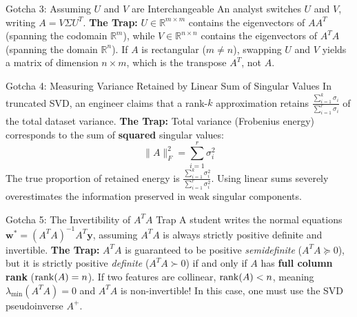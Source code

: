 \begin{trapbox}{Gotcha 3: Assuming $U$ and $V$ are Interchangeable}
An analyst switches $U$ and $V$, writing $A = V \Sigma U^T$.
\textbf{The Trap:} $U \in \mathbb{R}^{m \times m}$ contains the eigenvectors of $A A^T$ (spanning the codomain $\mathbb{R}^m$), while $V \in \mathbb{R}^{n \times n}$ contains the eigenvectors of $A^T A$ (spanning the domain $\mathbb{R}^n$). If $A$ is rectangular ($m \ne n$), swapping $U$ and $V$ yields a matrix of dimension $n \times m$, which is the transpose $A^T$, not $A$.
\end{trapbox}

\begin{trapbox}{Gotcha 4: Measuring Variance Retained by Linear Sum of Singular Values}
In truncated SVD, an engineer claims that a rank-$k$ approximation retains $\frac{\sum_{i=1}^k \sigma_i}{\sum_{i=1}^r \sigma_i}$ of the total dataset variance.
\textbf{The Trap:} Total variance (Frobenius energy) corresponds to the sum of \textbf{squared} singular values:
\begin{equation*}
\|A\|_F^2 = \sum_{i=1}^r \sigma_i^2
\end{equation*}
The true proportion of retained energy is $\frac{\sum_{i=1}^k \sigma_i^2}{\sum_{i=1}^r \sigma_i^2}$. Using linear sums severely overestimates the information preserved in weak singular components.
\end{trapbox}

\begin{trapbox}{Gotcha 5: The Invertibility of $A^T A$ Trap}
A student writes the normal equations $\mathbf{w}^* = (A^T A)^{-1} A^T \mathbf{y}$, assuming $A^T A$ is always strictly positive definite and invertible.
\textbf{The Trap:} $A^T A$ is guaranteed to be positive \emph{semidefinite} ($A^T A \succeq 0$), but it is strictly positive \emph{definite} ($A^T A \succ 0$) if and only if $A$ has \textbf{full column rank} ($\operatorname{rank}(A) = n$). If two features are collinear, $\operatorname{rank}(A) < n$, meaning $\lambda_{\min}(A^T A) = 0$ and $A^T A$ is non-invertible! In this case, one must use the SVD pseudoinverse $A^+$.
\end{trapbox}

